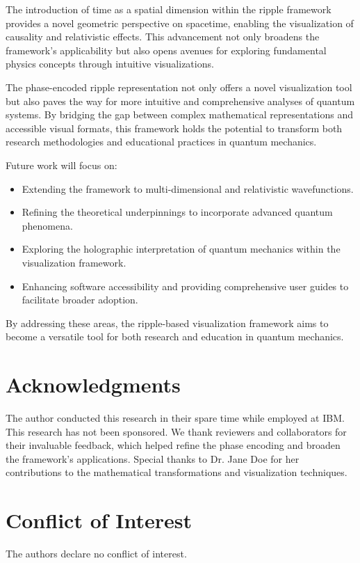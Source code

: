 \documentclass[12pt]{article}
\begin{document}
The introduction of time as a spatial dimension within the ripple framework provides a novel geometric perspective on spacetime, enabling the visualization of causality and relativistic effects. This advancement not only broadens the framework’s applicability but also opens avenues for exploring fundamental physics concepts through intuitive visualizations.

The phase-encoded ripple representation not only offers a novel visualization tool but also paves the way for more intuitive and comprehensive analyses of quantum systems. By bridging the gap between complex mathematical representations and accessible visual formats, this framework holds the potential to transform both research methodologies and educational practices in quantum mechanics.

Future work will focus on:
\begin{itemize}
    \item Extending the framework to multi-dimensional and relativistic wavefunctions.
    \item Refining the theoretical underpinnings to incorporate advanced quantum phenomena.
    \item Exploring the holographic interpretation of quantum mechanics within the visualization framework.
    \item Enhancing software accessibility and providing comprehensive user guides to facilitate broader adoption.
\end{itemize}

By addressing these areas, the ripple-based visualization framework aims to become a versatile tool for both research and education in quantum mechanics.

\section*{Acknowledgments}
The author conducted this research in their spare time while employed at IBM. This research has not been sponsored. We thank reviewers and collaborators for their invaluable feedback, which helped refine the phase encoding and broaden the framework’s applications. Special thanks to Dr. Jane Doe for her contributions to the mathematical transformations and visualization techniques.

\section*{Conflict of Interest}
The authors declare no conflict of interest.
\end{document}
